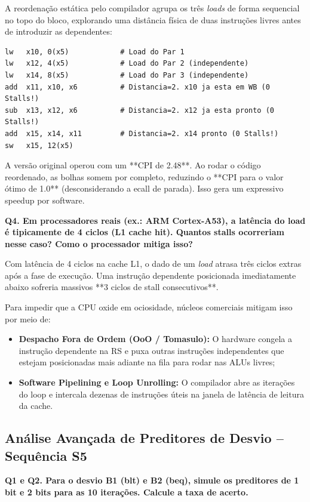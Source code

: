 \documentclass[12pt,a4paper]{article}
\begin{document}
A reordenação estática pelo compilador agrupa os três \textit{loads} de forma sequencial no topo do bloco, explorando uma distância física de duas instruções livres antes de introduzir as dependentes:
\begin{lstlisting}[language={[RISC-V]Assembler}, caption=S3 Reordenado sem Stalls]
lw   x10, 0(x5)            # Load do Par 1
lw   x12, 4(x5)            # Load do Par 2 (independente)
lw   x14, 8(x5)            # Load do Par 3 (independente)
add  x11, x10, x6          # Distancia=2. x10 ja esta em WB (0 Stalls!)
sub  x13, x12, x6          # Distancia=2. x12 ja esta pronto (0 Stalls!)
add  x15, x14, x11         # Distancia=2. x14 pronto (0 Stalls!)
sw   x15, 12(x5)
\end{lstlisting}
A versão original operou com um **CPI de 2.48**. Ao rodar o código reordenado, as bolhas somem por completo, reduzindo o **CPI para o valor ótimo de 1.0** (desconsiderando a ecall de parada). Isso gera um expressivo speedup por software.

\textbf{Q4. Em processadores reais (ex.: ARM Cortex-A53), a latência do load é tipicamente de 4 ciclos (L1 cache hit). Quantos stalls ocorreriam nesse caso? Como o processador mitiga isso?}

Com latência de 4 ciclos na cache L1, o dado de um \textit{load} atrasa três ciclos extras após a fase de execução. Uma instrução dependente posicionada imediatamente abaixo sofreria massivos **3 ciclos de stall consecutivos**.

Para impedir que a CPU oxide em ociosidade, núcleos comerciais mitigam isso por meio de:
\begin{itemize}
    \item \textbf{Despacho Fora de Ordem (OoO / Tomasulo):} O hardware congela a instrução dependente na RS e puxa outras instruções independentes que estejam posicionadas mais adiante na fila para rodar nas ALUs livres;
    \item \textbf{Software Pipelining e Loop Unrolling:} O compilador abre as iterações do loop e intercala dezenas de instruções úteis na janela de latência de leitura da cache.
\end{itemize}

\subsection{Análise Avançada de Preditores de Desvio -- Sequência S5}

\textbf{Q1 e Q2. Para o desvio B1 (blt) e B2 (beq), simule os preditores de 1 bit e 2 bits para as 10 iterações. Calcule a taxa de acerto.}
\end{document}

